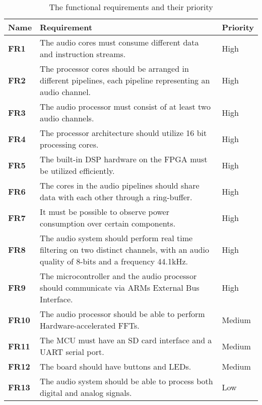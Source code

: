 
\begin{table}[H]
\centering
    \begin{tabular}{| l | p{8cm} | l |}
    \hline
    \textbf{Name} & \textbf{Requirement} & \textbf{Priority}\\
    \hline \hline
    \textbf{FR1} 
        & The audio cores must consume different data and instruction streams. 
        & High\\
    \textbf{FR2} 
        & The processor cores should be arranged in different pipelines,
        each pipeline representing an audio channel. 
        & High\\
    \textbf{FR3} 
        & The audio processor must consist of at least two audio channels. 
        & High\\
    \textbf{FR4} 
        & The processor architecture should utilize 16 bit processing cores. 
        & High\\
    \textbf{FR5} 
        & The built-in DSP hardware on the FPGA must be utilized efficiently. 
        & High\\
    \textbf{FR6}
        & The cores in the audio pipelines should share data with each other
        through a ring-buffer.
        & High\\
    \textbf{FR7} 
        & It must be possible to observe power consumption over certain components.
        & High\\
    \textbf{FR8} 
        & The audio system should perform real time filtering on
        two distinct channels, with an audio quality of 8-bits and a frequency 44.1kHz.
        & High\\
    \textbf{FR9} 
        & The microcontroller and the audio processor should communicate via ARMs
        External Bus Interface.
        & High\\
    \textbf{FR10}
        & The audio processor should be able to perform Hardware-accelerated FFTs.
        & Medium \\
    \textbf{FR11}
        & The MCU must have an SD card interface and a UART serial port.
        & Medium \\
    \textbf{FR12}
        & The board should have buttons and LEDs.
        & Medium \\
    \textbf{FR13}
        & The audio system should be able to process both digital and analog signals.
        & Low \\
    \hline
    \end{tabular}
    \caption{The functional requirements and their priority}
    \label{tab:funref}
\end{table}
